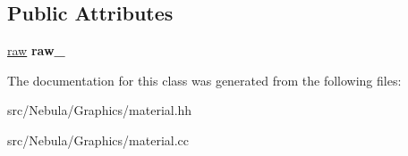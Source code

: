 \subsection*{Public Attributes}
\begin{DoxyCompactItemize}
\item 
\hypertarget{classNeb_1_1material_1_1material_aba15a8b4c829ec39dfb71ccfcc1ad1f6}{\hyperlink{structNeb_1_1material_1_1raw}{raw} {\bfseries raw\-\_\-}}\label{classNeb_1_1material_1_1material_aba15a8b4c829ec39dfb71ccfcc1ad1f6}

\end{DoxyCompactItemize}


The documentation for this class was generated from the following files\-:\begin{DoxyCompactItemize}
\item 
src/\-Nebula/\-Graphics/material.\-hh\item 
src/\-Nebula/\-Graphics/material.\-cc\end{DoxyCompactItemize}
